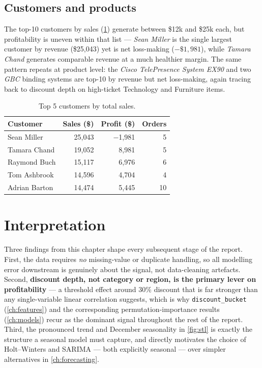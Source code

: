 \subsection{Customers and products}
The top-10 customers by sales (\cref{tab:top-cust}) generate between
\$12k and \$25k each, but profitability is uneven within that list —
\emph{Sean Miller} is the single largest customer by revenue (\$25{,}043)
yet is net loss-making ($-\$1{,}981$), while \emph{Tamara Chand} generates
comparable revenue at a much healthier margin. The same pattern repeats at
product level: the \emph{Cisco TelePresence System EX90} and two
\emph{GBC} binding systems are top-10 by revenue but net loss-making,
again tracing back to discount depth on high-ticket Technology and
Furniture items.

\begin{table}[H]
  \centering
  \caption{Top 5 customers by total sales.}
  \label{tab:top-cust}
  \begin{tabular}{@{}lrrr@{}}
    \toprule
    Customer & Sales (\$) & Profit (\$) & Orders \\
    \midrule
    Sean Miller     & 25{,}043 & $-$1{,}981 & 5 \\
    Tamara Chand    & 19{,}052 & 8{,}981    & 5 \\
    Raymond Buch    & 15{,}117 & 6{,}976    & 6 \\
    Tom Ashbrook    & 14{,}596 & 4{,}704    & 4 \\
    Adrian Barton   & 14{,}474 & 5{,}445    & 10 \\
    \bottomrule
  \end{tabular}
\end{table}

\section{Interpretation}
Three findings from this chapter shape every subsequent stage of the
report. First, the data requires \emph{no} missing-value or duplicate
handling, so all modelling error downstream is genuinely about the
signal, not data-cleaning artefacts. Second, \textbf{discount depth, not
category or region, is the primary lever on profitability} — a threshold
effect around 30\% discount that is far stronger than any single-variable
linear correlation suggests, which is why \texttt{discount\_bucket}
(\cref{ch:features}) and the corresponding permutation-importance results
(\cref{ch:models}) recur as the dominant signal throughout the rest of the
report. Third, the pronounced trend and December seasonality in
\cref{fig:stl} is exactly the structure a seasonal model must capture,
and directly motivates the choice of Holt--Winters and SARIMA — both
explicitly seasonal — over simpler alternatives in \cref{ch:forecasting}.
